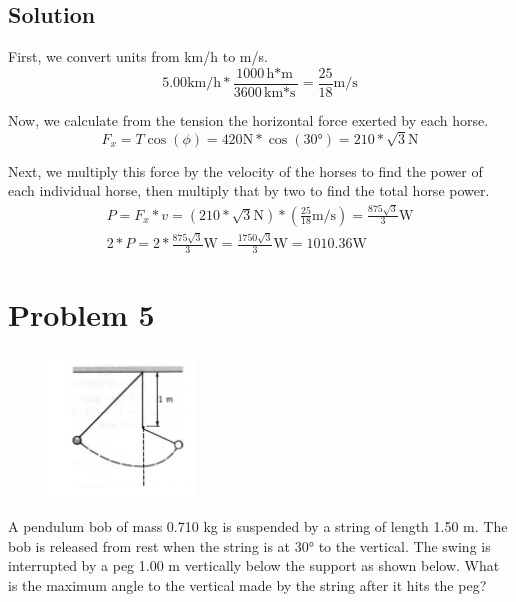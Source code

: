 \documentclass[12pt]{article}
\begin{document}
\subsection*{Solution}
First, we convert units from km/h to m/s. 
\[ 5.00 \unit{\kilo\meter/\hour} * \frac{1000 \unit{\hour*\meter}}{3600 \unit{\kilo\meter*\second}} = \frac{25}{18} \unit{\meter/\second} \]

Now, we calculate from the tension the horizontal force exerted by each horse.
\[ F_x = T\cos(\phi) = 420\unit{\newton} * \cos(30\unit{\degree}) = 210*\sqrt{3}\unit{\newton} \]

Next, we multiply this force by the velocity of the horses to find the power of each individual horse, then multiply that by two to find the total horse power.
\begin{eqnarray*}
    P = F_x*v = (210*\sqrt{3}\unit{\newton}) * (\frac{25}{18} \unit{\meter/\second}) = \frac{875\sqrt{3}}{3} \unit{\watt}\\
    2*P = 2*\frac{875\sqrt{3}}{3} \unit{\watt} = \frac{1750\sqrt{3}}{3} \unit{\watt} = \boxed{1010.36 \unit{\watt}}
\end{eqnarray*}

\pagebreak
\section*{Problem 5}
\begin{figure}
    \vspace{-30pt}
    \includegraphics[width=0.35\textwidth]{graph_5.png} 
\end{figure}
A pendulum bob of mass 0.710 kg is suspended by a string of length 1.50 m. The bob is released from rest
when the string is at 30\unit{\degree} to the vertical. The swing is interrupted by a peg 1.00 m vertically below the support
as shown below. What is the maximum angle to the vertical made by the string after it hits the peg?
\end{document}
